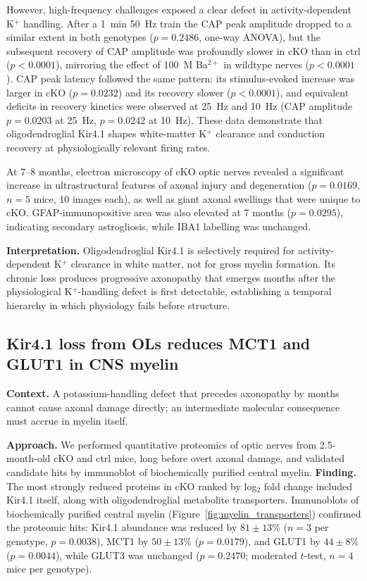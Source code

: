 \documentclass[11pt,a4paper]{article}
\begin{document}
However, high-frequency challenges exposed a clear defect in activity-dependent K$^+$ handling. After a 1~min 50~Hz train the CAP peak amplitude dropped to a similar extent in both genotypes ($p=0.2486$, one-way ANOVA), but the subsequent recovery of CAP amplitude was profoundly slower in cKO than in ctrl ($p<0.0001$), mirroring the effect of 100~\textmu M Ba$^{2+}$ in wildtype nerves ($p<0.0001$). CAP peak latency followed the same pattern: its stimulus-evoked increase was larger in cKO ($p=0.0232$) and its recovery slower ($p<0.0001$), and equivalent deficits in recovery kinetics were observed at 25~Hz and 10~Hz (CAP amplitude $p=0.0203$ at 25~Hz, $p=0.0242$ at 10~Hz). These data demonstrate that oligodendroglial Kir4.1 shapes white-matter K$^+$ clearance and conduction recovery at physiologically relevant firing rates.

At 7--8 months, electron microscopy of cKO optic nerves revealed a significant increase in ultrastructural features of axonal injury and degeneration ($p=0.0169$, $n=5$ mice, 10 images each), as well as giant axonal swellings that were unique to cKO. GFAP-immunopositive area was also elevated at 7 months ($p=0.0295$), indicating secondary astrogliosis, while IBA1 labelling was unchanged.

\textbf{Interpretation.} Oligodendroglial Kir4.1 is selectively required for activity-dependent K$^+$ clearance in white matter, not for gross myelin formation. Its chronic loss produces progressive axonopathy that emerges months after the physiological K$^+$-handling defect is first detectable, establishing a temporal hierarchy in which physiology fails before structure.

\subsection{Kir4.1 loss from OLs reduces MCT1 and GLUT1 in CNS myelin}

\textbf{Context.} A potassium-handling defect that precedes axonopathy by months cannot cause axonal damage directly; an intermediate molecular consequence must accrue in myelin itself.

\textbf{Approach.} We performed quantitative proteomics of optic nerves from 2.5-month-old cKO and ctrl mice, long before overt axonal damage, and validated candidate hits by immunoblot of biochemically purified central myelin. \textbf{Finding.} The most strongly reduced proteins in cKO ranked by log$_2$ fold change included Kir4.1 itself, along with oligodendroglial metabolite transporters. Immunoblots of biochemically purified central myelin (Figure~\ref{fig:myelin_transporters}) confirmed the proteomic hits: Kir4.1 abundance was reduced by $81 \pm 13\%$ ($n=3$ per genotype, $p=0.0038$), MCT1 by $50 \pm 13\%$ ($p=0.0179$), and GLUT1 by $44 \pm 8\%$ ($p=0.0044$), while GLUT3 was unchanged ($p=0.2470$; moderated $t$-test, $n=4$ mice per genotype).
\end{document}
